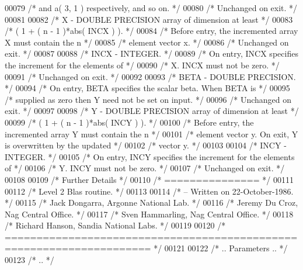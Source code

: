 \begin{DoxyCode}
00079 \textcolor{comment}{/*           and a( 3, 1 ) respectively, and so on. */}
00080 \textcolor{comment}{/*           Unchanged on exit. */}
00081 
00082 \textcolor{comment}{/*  X      - DOUBLE PRECISION array of dimension at least */}
00083 \textcolor{comment}{/*           ( 1 + ( n - 1 )*abs( INCX ) ). */}
00084 \textcolor{comment}{/*           Before entry, the incremented array X must contain the n */}
00085 \textcolor{comment}{/*           element vector x. */}
00086 \textcolor{comment}{/*           Unchanged on exit. */}
00087 
00088 \textcolor{comment}{/*  INCX   - INTEGER. */}
00089 \textcolor{comment}{/*           On entry, INCX specifies the increment for the elements of */}
00090 \textcolor{comment}{/*           X. INCX must not be zero. */}
00091 \textcolor{comment}{/*           Unchanged on exit. */}
00092 
00093 \textcolor{comment}{/*  BETA   - DOUBLE PRECISION. */}
00094 \textcolor{comment}{/*           On entry, BETA specifies the scalar beta. When BETA is */}
00095 \textcolor{comment}{/*           supplied as zero then Y need not be set on input. */}
00096 \textcolor{comment}{/*           Unchanged on exit. */}
00097 
00098 \textcolor{comment}{/*  Y      - DOUBLE PRECISION array of dimension at least */}
00099 \textcolor{comment}{/*           ( 1 + ( n - 1 )*abs( INCY ) ). */}
00100 \textcolor{comment}{/*           Before entry, the incremented array Y must contain the n */}
00101 \textcolor{comment}{/*           element vector y. On exit, Y is overwritten by the updated */}
00102 \textcolor{comment}{/*           vector y. */}
00103 
00104 \textcolor{comment}{/*  INCY   - INTEGER. */}
00105 \textcolor{comment}{/*           On entry, INCY specifies the increment for the elements of */}
00106 \textcolor{comment}{/*           Y. INCY must not be zero. */}
00107 \textcolor{comment}{/*           Unchanged on exit. */}
00108 
00109 \textcolor{comment}{/*  Further Details */}
00110 \textcolor{comment}{/*  =============== */}
00111 
00112 \textcolor{comment}{/*  Level 2 Blas routine. */}
00113 
00114 \textcolor{comment}{/*  -- Written on 22-October-1986. */}
00115 \textcolor{comment}{/*     Jack Dongarra, Argonne National Lab. */}
00116 \textcolor{comment}{/*     Jeremy Du Croz, Nag Central Office. */}
00117 \textcolor{comment}{/*     Sven Hammarling, Nag Central Office. */}
00118 \textcolor{comment}{/*     Richard Hanson, Sandia National Labs. */}
00119 
00120 \textcolor{comment}{/*  ===================================================================== */}
00121 
00122 \textcolor{comment}{/*     .. Parameters .. */}
00123 \textcolor{comment}{/*     .. */}

\end{DoxyCode}
